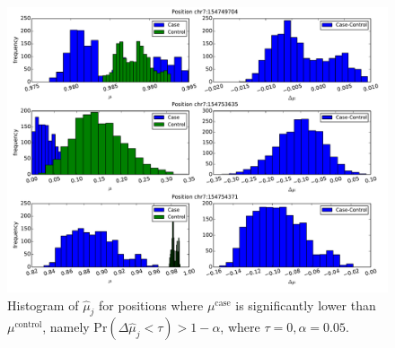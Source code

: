 \documentclass[11pt,reqno]{amsart}
\begin{document}
\begin{figure}[H]
\begin{center}
\includegraphics[width=1\textwidth]{pdf_figs/HCC1187_histogram_neg.pdf}
\caption{Histogram of $ \hat{\mu}_j $ for positions where $\mu^{\text{case}}$ is significantly lower than $ \mu^{\text{control}}$, namely Pr$ (\Delta \hat{\mu}_j< \tau) > 1- \alpha $, where $ \tau=0, \alpha=0.05 $.}
\label{fig:hist_neg}
\end{center}
\end{figure}

\bigskip
\bigskip






\end{document}
